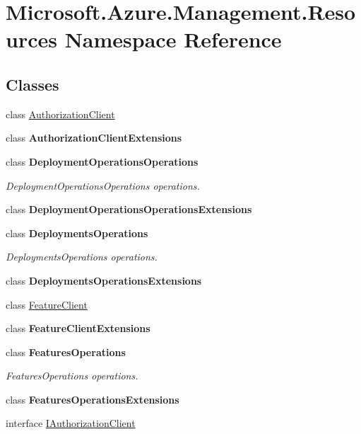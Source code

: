 \hypertarget{namespace_microsoft_1_1_azure_1_1_management_1_1_resources}{}\section{Microsoft.\+Azure.\+Management.\+Resources Namespace Reference}
\label{namespace_microsoft_1_1_azure_1_1_management_1_1_resources}
\subsection*{Classes}
\begin{DoxyCompactItemize}
\item 
class \hyperlink{class_microsoft_1_1_azure_1_1_management_1_1_resources_1_1_authorization_client}{Authorization\+Client}
\item 
class {\bfseries Authorization\+Client\+Extensions}
\item 
class {\bfseries Deployment\+Operations\+Operations}
\begin{DoxyCompactList}\small\item\em Deployment\+Operations\+Operations operations. \end{DoxyCompactList}\item 
class {\bfseries Deployment\+Operations\+Operations\+Extensions}
\item 
class {\bfseries Deployments\+Operations}
\begin{DoxyCompactList}\small\item\em Deployments\+Operations operations. \end{DoxyCompactList}\item 
class {\bfseries Deployments\+Operations\+Extensions}
\item 
class \hyperlink{class_microsoft_1_1_azure_1_1_management_1_1_resources_1_1_feature_client}{Feature\+Client}
\item 
class {\bfseries Feature\+Client\+Extensions}
\item 
class {\bfseries Features\+Operations}
\begin{DoxyCompactList}\small\item\em Features\+Operations operations. \end{DoxyCompactList}\item 
class {\bfseries Features\+Operations\+Extensions}
\item 
interface \hyperlink{interface_microsoft_1_1_azure_1_1_management_1_1_resources_1_1_i_authorization_client}{I\+Authorization\+Client}

\end{DoxyCompactItemize}
